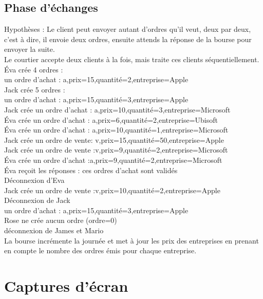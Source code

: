 \documentclass[11pt]{article}
\begin{document}
\subsection {Phase d'échanges}

Hypothèses : Le client peut envoyer autant d’ordres qu’il veut, deux par deux, c’est à dire, il envoie deux ordres, ensuite attends la réponse de la bourse pour envoyer la suite. \\
Le courtier accepte deux clients à la fois, mais traite ces clients séquentiellement. \\

Éva crée 4 ordres :        \\      
un ordre d’achat : a,prix=15,quantité=2,entreprise=Apple \\
Jack crée 5 ordres :  \\
un ordre d’achat : a,prix=15,quantité=3,entreprise=Apple \\
Jack crée un ordre d’achat : a,prix=10,quantité=3,entreprise=Microsoft  \\
Éva crée un ordre d’achat : a,prix=6,quantité=2,entreprise=Ubisoft  \\
Éva crée un ordre d’achat : a,prix=10,quantité=1,entreprise=Microsoft \\
Jack crée un ordre de vente: v,prix=15,quantité=50,entreprise=Apple \\
Jack crée un ordre de vente :v,prix=9,quantité=2,entreprise=Microsoft \\
Éva crée un ordre d’achat :a,prix=9,quantité=2,entreprise=Microsoft   \\
Éva reçoit les réponses : ces ordres d’achat sont validés  \\
Déconnexion d’Eva  \\
Jack crée un ordre de vente :v,prix=10,quantité=2,entreprise=Apple  \\
Déconnexion de Jack  \\
un ordre d’achat : a,prix=15,quantité=3,entreprise=Apple  \\
Rose ne crée aucun ordre (ordre=0)  \\
déconnexion de James et Mario  \\
La bourse incrémente la journée et met à jour les prix des entreprises en prenant en compte le nombre des ordres émis pour chaque entreprise.  \\

\section {Captures d'écran}
\end{document}
